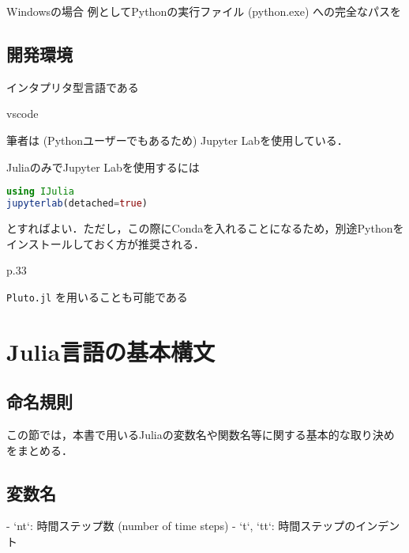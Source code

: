 \documentclass[titlepage]{ltjsbook}
\newcommand{\jl}{\lstinline[language=julia]}
\begin{document}
Windowsの場合
例としてPythonの実行ファイル (python.exe) への完全なパスを


\subsection{開発環境}

インタプリタ型言語である

vscode

筆者は (Pythonユーザーでもあるため) Jupyter Labを使用している．

JuliaのみでJupyter Labを使用するには

\begin{lstlisting}[language=julia]
using IJulia
jupyterlab(detached=true)
\end{lstlisting}

とすればよい．ただし，この際にCondaを入れることになるため，別途Pythonをインストールしておく方が推奨される．

p.33

\jl{Pluto.jl} を用いることも可能である

\section{Julia言語の基本構文}


\subsection{命名規則}
この節では，本書で用いるJuliaの変数名や関数名等に関する基本的な取り決めをまとめる．

\subsection{変数名}
- `nt`: 時間ステップ数 (number of time steps)
- `t`, `tt`: 時間ステップのインデント

\printbibliography[segment=\therefsegment,heading=subbibliography,title={参考文献}]
\end{document}
